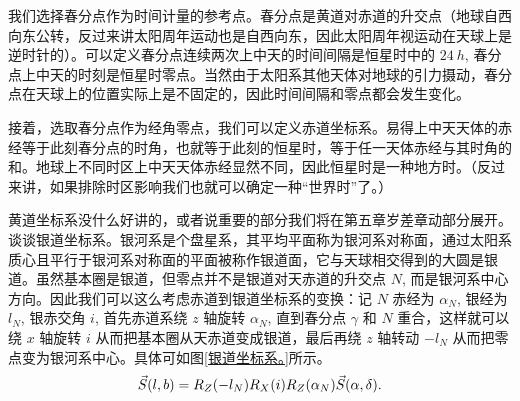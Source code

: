 \documentclass[UTF8, 12pt, a4paper, oneside, onecolumn, fontset=none]{ctexart}
\begin{document}
我们选择春分点作为时间计量的参考点。春分点是黄道对赤道的升交点（地球自西向东公转，反过来讲太阳周年运动也是自西向东，因此太阳周年视运动在天球上是逆时针的）。可以定义春分点连续两次上中天的时间间隔是恒星时中的 $\qty{24}{h}$, 春分点上中天的时刻是恒星时零点。当然由于太阳系其他天体对地球的引力摄动，春分点在天球上的位置实际上是不固定的，因此时间间隔和零点都会发生变化。

接着，选取春分点作为经角零点，我们可以定义赤道坐标系。易得上中天天体的赤经等于此刻春分点的时角，也就等于此刻的恒星时，等于任一天体赤经与其时角的和。地球上不同时区上中天天体赤经显然不同，因此恒星时是一种地方时。（反过来讲，如果排除时区影响我们也就可以确定一种“世界时”了。）

黄道坐标系没什么好讲的，或者说重要的部分我们将在第五章岁差章动部分展开。谈谈银道坐标系。银河系是个盘星系，其平均平面称为银河系对称面，通过太阳系质心且平行于银河系对称面的平面被称作银道面，它与天球相交得到的大圆是银道。虽然基本圈是银道，但零点并不是银道对天赤道的升交点 $N$, 而是银河系中心方向。因此我们可以这么考虑赤道到银道坐标系的变换：记 $N$ 赤经为 $\alpha_{N}$, 银经为 $l_{N}$, 银赤交角 $i$, 首先赤道系绕 $z$ 轴旋转 $\alpha_{N}$, 直到春分点 $\gamma$ 和 $N$ 重合，这样就可以绕 $x$ 轴旋转 $i$ 从而把基本圈从天赤道变成银道，最后再绕 $z$ 轴转动 $-l_{N}$ 从而把零点变为银河系中心。具体可如图\ref{银道坐标系。}所示。
\begin{equation}
\vec{S}\mleft(l, b\mright)=R_{Z}\mleft(-l_{N}\mright) R_{X}\mleft(i\mright) R_{Z}\mleft(\alpha_{N}\mright)\vec{S}\mleft(\alpha,\delta\mright).
\end{equation}
\end{document}
